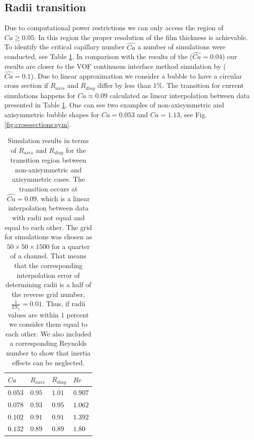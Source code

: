 \documentclass[preprint,12pt]{elsarticle}
\begin{document}
\subsection{Radii transition}
Due to computational power restrictions we can only access the
region of $Ca\geq 0.05$. In this region the proper resolution of the film thickness
is achievable.  To identify the critical capillary number $\widehat{Ca}$ a number of
simulations
were conducted, see Table \ref{table:transition:results}. In comparison with the results of the
\citet{heil-threedim}
($\widehat{Ca}=0.04$) our
results are closer to the VOF continuous interface method simulation by
\citet{wang-non-circular} ($\widehat{Ca}=0.1$). Due to linear approximation we consider a bubble to have a circular cross section if $R_{axis}$ and $R_{diag}$ differ by less than $1\%$. The transition for current simulations
happens for $Ca\approx 0.09$ calculated as linear interpolation between data presented in Table
\ref{table:transition:results}. 
One can see
two examples of non-axisymmetric and axisymmetric bubble shapes for $Ca=0.053$ and $Ca=1.13$, see
Fig.
\ref{fig:crosssections:sym}.  
\begin{table}
\begin{tabularx}{\textwidth}{|X|X|X|X|}%
\hline
$Ca$&$R_{axis}$&$R_{diag}$&$Re$\\ %
\hline
$0.053$&$0.95$&$1.01$&$0.907$\\%
$0.078$&$0.93$&$0.95$&$1.062$\\%
$0.102$&$0.91$&$0.91$&$1.392$\\
$0.132$&$0.89$&$0.89$&$1.80$\\%
\hline
\end{tabularx}
\caption{Simulation results in terms of $R_{axis}$ and $R_{diag}$ for the transition region between
non-axisymmetric and axisymmetric cases. The transition occurs at $\widehat{Ca}=0.09$, which is a
linear interpolation between data with radii not equal and equal to each other. The grid for
simulations was chosen as $50\times50\times1500$ for a quarter of a channel. That means that the
corresponding interpolation error of determining radii is a half of the reverse grid number,
$\frac{1}{2 N_x}=0.01$. Thus, if radii values are within $1$ percent we consider them equal to
each other. We also included a corresponding Reynolds number to show that inertia effects can be
neglected.
\label{table:transition:results}}
\end{table}
\end{document}
